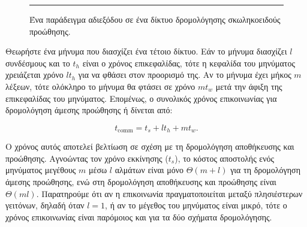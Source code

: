 \documentclass[12pt,a4paper]{article} %
\begin{document}
\begin{figure}[H]
\noindent\rule{\textwidth}{0.2pt}
\caption{Ένα παράδειγμα αδιεξόδου σε ένα δίκτυο δρομολόγησης σκωληκοειδούς προώθησης.}
\label{fig:graph54}
\end{figure}
\vspace{0.3cm}

Θεωρήστε ένα μήνυμα που διασχίζει ένα τέτοιο δίκτυο. Εάν το μήνυμα
διασχίζει $l$ συνδέσμους και το $t_h$ είναι ο χρόνος επικεφαλίδας, τότε η 
κεφαλίδα του μηνύματος χρειάζεται χρόνο $l t_h$ για να φθάσει στον 
προορισμό της. Αν το μήνυμα έχει μήκος $m$ λέξεων, τότε ολόκληρο το μήνυμα
θα φτάσει σε χρόνο $mt_w$ μετά την άφιξη της επικεφαλίδας του μηνύματος.
Επομένως, ο συνολικός χρόνος επικοινωνίας για δρομολόγηση άμεσης προώθησης ή
δίνεται από:

\[
t_{\text{comm}} = t_s + lt_h + mt_w.
\]

\noindent Ο χρόνος αυτός αποτελεί βελτίωση σε σχέση με τη δρομολόγηση
αποθήκευσης και προώθησης. Αγνοώντας τον χρόνο εκκίνησης ($t_s$), το 
κόστος αποστολής ενός μηνύματος μεγέθους $m$ μέσω $l$ αλμάτων είναι μόνο 
$\Theta(m+l)$ για τη δρομολόγηση άμεσης προώθησης, ενώ στη δρομολόγηση
αποθήκευσης και προώθησης είναι $\Theta(ml)$. Παρατηρούμε ότι αν η 
επικοινωνία πραγματοποιείται μεταξύ πλησιέστερων γειτόνων, δηλαδή όταν 
$l=1$, ή αν το μέγεθος του μηνύματος είναι μικρό, τότε ο χρόνος 
επικοινωνίας είναι παρόμοιος και για τα δύο σχήματα δρομολόγησης.
\end{document}
